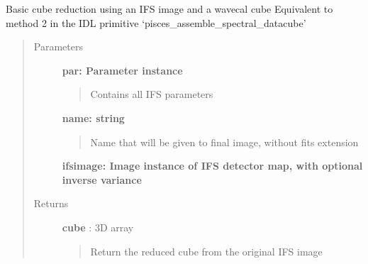 \documentclass[letterpaper,10pt,english]{sphinxmanual}
\begin{document}
\begin{fulllineitems}
\label{tools:tools.reduction.GPImethod2}
Basic cube reduction using an IFS image and a wavecal cube
Equivalent to method 2 in the IDL primitive `pisces\_assemble\_spectral\_datacube'
\begin{quote}\begin{description}
\item[{Parameters}] \leavevmode
\textbf{par:    Parameter instance}
\begin{quote}

Contains all IFS parameters
\end{quote}

\textbf{name: string}
\begin{quote}

Name that will be given to final image, without fits extension
\end{quote}

\textbf{ifsimage: Image instance of IFS detector map, with optional inverse variance}

\item[{Returns}] \leavevmode
\textbf{cube} :  3D array
\begin{quote}

Return the reduced cube from the original IFS image
\end{quote}

\end{description}\end{quote}

\end{fulllineitems}

\end{document}
